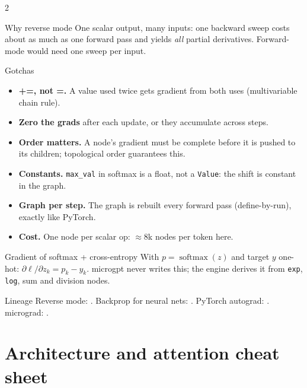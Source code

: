 \documentclass[10pt,letterpaper]{article}
\newcommand{\code}[1]{\lstinline[basicstyle=\ttfamily\small]|#1|}
\newcommand{\softmax}{\operatorname{softmax}}
\begin{document}
\begin{multicols}{2}
\begin{csb}{Why reverse mode}
One scalar output, many inputs: one backward sweep costs about as much as one forward pass and yields \emph{all} partial derivatives. Forward-mode would need one sweep per input. \parencite{baydin2018autodiff,griewank2008evaluating}
\end{csb}

\begin{csb}{Gotchas}
\begin{itemize}
  \item \textbf{+=, not =.} A value used twice gets gradient from both uses (multivariable chain rule).
  \item \textbf{Zero the grads} after each update, or they accumulate across steps.
  \item \textbf{Order matters.} A node's gradient must be complete before it is pushed to its children; topological order guarantees this.
  \item \textbf{Constants.} \code{max_val} in softmax is a float, not a \code{Value}: the shift is constant in the graph.
  \item \textbf{Graph per step.} The graph is rebuilt every forward pass (define-by-run), exactly like PyTorch.
  \item \textbf{Cost.} One node per scalar op: $\approx 8$k nodes per token here.
\end{itemize}
\end{csb}

\begin{csb}{Gradient of softmax + cross-entropy}
With $p=\softmax(z)$ and target $y$ one-hot: $\partial\ell/\partial z_k = p_k - y_k$. microgpt never writes this; the engine derives it from \code{exp}, \code{log}, sum and division nodes.
\end{csb}

\begin{csb}{Lineage}
Reverse mode: \textcite{linnainmaa1976taylor}. Backprop for neural nets: \textcite{rumelhart1986learning}. PyTorch autograd: \textcite{paszke2017autodiff}. micrograd: \textcite{karpathy2020micrograd,karpathy2022microgradvideo}.
\end{csb}
\end{multicols}

\clearpage
\section{Architecture and attention cheat sheet}
\end{document}
